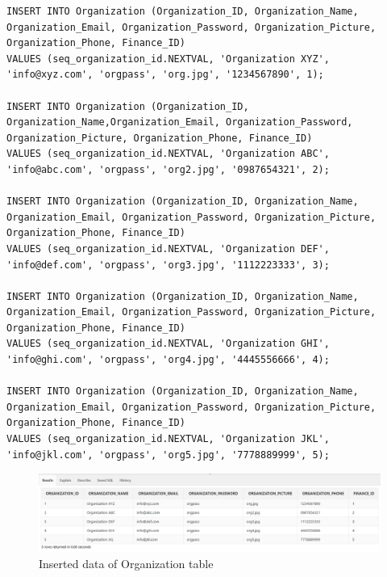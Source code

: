 \begin{lstlisting}[caption={Inserting data into Organization tables},label={lst:insert_Organization}]
INSERT INTO Organization (Organization_ID, Organization_Name, Organization_Email, Organization_Password, Organization_Picture, Organization_Phone, Finance_ID)
VALUES (seq_organization_id.NEXTVAL, 'Organization XYZ', 'info@xyz.com', 'orgpass', 'org.jpg', '1234567890', 1);

INSERT INTO Organization (Organization_ID, Organization_Name,Organization_Email, Organization_Password, Organization_Picture, Organization_Phone, Finance_ID)
VALUES (seq_organization_id.NEXTVAL, 'Organization ABC', 'info@abc.com', 'orgpass', 'org2.jpg', '0987654321', 2);

INSERT INTO Organization (Organization_ID, Organization_Name, Organization_Email, Organization_Password, Organization_Picture, Organization_Phone, Finance_ID)
VALUES (seq_organization_id.NEXTVAL, 'Organization DEF', 'info@def.com', 'orgpass', 'org3.jpg', '1112223333', 3);

INSERT INTO Organization (Organization_ID, Organization_Name, Organization_Email, Organization_Password, Organization_Picture, Organization_Phone, Finance_ID)
VALUES (seq_organization_id.NEXTVAL, 'Organization GHI', 'info@ghi.com', 'orgpass', 'org4.jpg', '4445556666', 4);

INSERT INTO Organization (Organization_ID, Organization_Name, Organization_Email, Organization_Password, Organization_Picture, Organization_Phone, Finance_ID)
VALUES (seq_organization_id.NEXTVAL, 'Organization JKL', 'info@jkl.com', 'orgpass', 'org5.jpg', '7778889999', 5);
\end{lstlisting}
\begin{figure}[H]
    \centering
    \includegraphics[width=1\textwidth]{images/TableData/ORGANIZATION.png}
    \caption{Inserted data of Organization table}
\end{figure}



